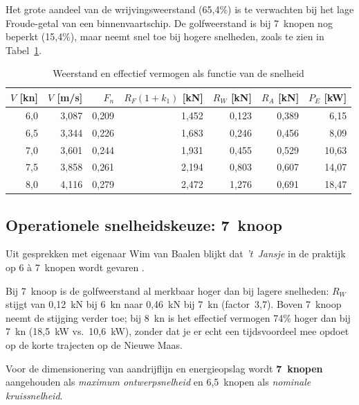 Het grote aandeel van de wrijvingsweerstand (65{,}4\%) is te verwachten bij het lage
Froude-getal van een binnenvaartschip. De golfweerstand is bij 7~knopen nog beperkt
(15{,}4\%), maar neemt snel toe bij hogere snelheden, zoals te zien in
Tabel~\ref{tab:holtrop_speed_series}.

\begin{table}[H]
\centering
\caption{Weerstand en effectief vermogen als functie van de snelheid
         \cite{spreadsheet_holtrop}}
\label{tab:holtrop_speed_series}
\begin{tabular}{rrrrrrr}
\toprule
$V$ [kn] & $V$ [m/s] & $F_n$ & $R_F(1{+}k_1)$ [kN] & $R_W$ [kN] & $R_A$ [kN]
         & $P_E$ [kW] \\
\midrule
6{,}0 & 3{,}087 & 0{,}209 & 1{,}452 & 0{,}123 & 0{,}389 &  6{,}15 \\
6{,}5 & 3{,}344 & 0{,}226 & 1{,}683 & 0{,}246 & 0{,}456 &  8{,}09 \\
\rowcolor{green!15}
7{,}0 & 3{,}601 & 0{,}244 & 1{,}931 & 0{,}455 & 0{,}529 & 10{,}63 \\
7{,}5 & 3{,}858 & 0{,}261 & 2{,}194 & 0{,}803 & 0{,}607 & 14{,}07 \\
8{,}0 & 4{,}116 & 0{,}279 & 2{,}472 & 1{,}276 & 0{,}691 & 18{,}47 \\
\bottomrule
\end{tabular}
\end{table}

\subsection{Operationele snelheidskeuze: 7~knoop}
\label{subsec:snelheidskeuze}

Uit gesprekken met eigenaar Wim van Baalen blijkt dat \emph{'t~Jansje} in de
praktijk op 6 à 7~knopen wordt gevaren \cite{vanbaalen2026interview}.

Bij 7~knoop is de golfweerstand al merkbaar hoger dan bij lagere snelheden:
$R_W$ stijgt van 0{,}12~kN bij 6~kn naar 0{,}46~kN bij 7~kn (factor~3{,}7).
Boven 7~knoop neemt de stijging verder toe; bij 8~kn is het effectief vermogen
74\% hoger dan bij 7~kn (18{,}5~kW vs.\ 10{,}6~kW), zonder dat je er echt een
tijdsvoordeel mee opdoet op de korte trajecten op de Nieuwe Maas.

Voor de dimensionering van aandrijflijn en energieopslag wordt \textbf{7~knopen}
aangehouden als \emph{maximum ontwerpsnelheid} en 6{,}5~knopen als
\emph{nominale kruissnelheid}.

